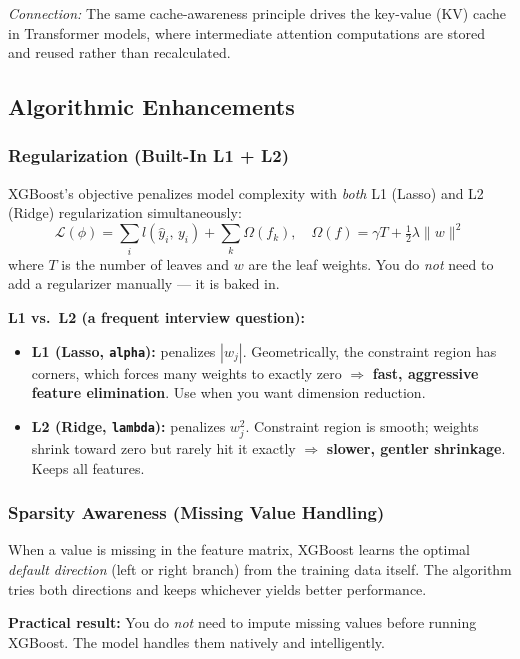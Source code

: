 \documentclass[11pt]{article}
\begin{document}
\textit{Connection:} The same cache-awareness principle drives the key-value (KV)
cache in Transformer models, where intermediate attention computations are stored
and reused rather than recalculated.

\subsection{Algorithmic Enhancements}

\subsubsection{Regularization (Built-In L1 + L2)}
XGBoost's objective penalizes model complexity with \emph{both} L1 (Lasso) and L2
(Ridge) regularization simultaneously:
\[
\mathcal{L}(\phi) = \sum_i l(\hat{y}_i,\, y_i) + \sum_k \Omega(f_k),
\quad \Omega(f) = \gamma T + \tfrac{1}{2}\lambda\|w\|^2
\]
where $T$ is the number of leaves and $w$ are the leaf weights. You do \emph{not}
need to add a regularizer manually --- it is baked in.

\textbf{L1 vs.\ L2 (a frequent interview question):}
\begin{itemize}
    \item \textbf{L1 (Lasso, \texttt{alpha}):} penalizes $|w_j|$.
      Geometrically, the constraint region has corners, which forces many weights
      to exactly zero $\Rightarrow$ \textbf{fast, aggressive feature elimination}.
      Use when you want dimension reduction.
    \item \textbf{L2 (Ridge, \texttt{lambda}):} penalizes $w_j^2$.
      Constraint region is smooth; weights shrink toward zero but rarely hit it
      exactly $\Rightarrow$ \textbf{slower, gentler shrinkage}. Keeps all features.
\end{itemize}

\subsubsection{Sparsity Awareness (Missing Value Handling)}
When a value is missing in the feature matrix, XGBoost learns the optimal
\emph{default direction} (left or right branch) from the training data itself.
The algorithm tries both directions and keeps whichever yields better performance.

\textbf{Practical result:} You do \emph{not} need to impute missing values before
running XGBoost. The model handles them natively and intelligently.
\end{document}

